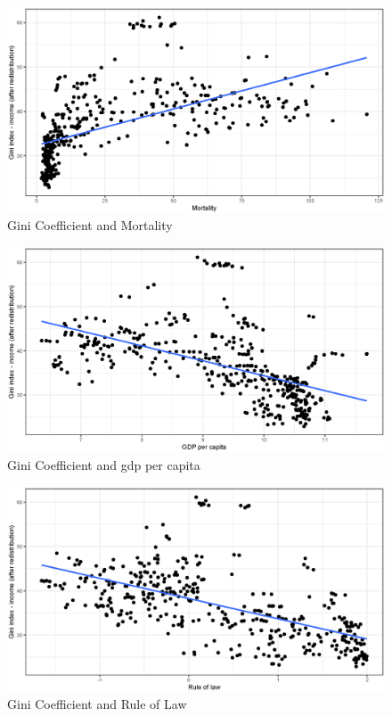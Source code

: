 \documentclass[a4paper,11pt]{article}
\begin{document}
\begin{figure}
    \caption{Gini Coefficient and Mortality}
    \label{fig:ginimort}
\includegraphics[width=\textwidth, keepaspectratio]{figures/MortGiniNet}
\end{figure}

\begin{figure}
    \caption{Gini Coefficient and \ac{gdp} per capita}
    \label{fig:ginigdp}
\includegraphics[width=\textwidth, keepaspectratio]{figures/GDPGiniNet}
\end{figure}

\begin{figure}
    \caption{Gini Coefficient and Rule of Law}
    \label{fig:ginirule}
\includegraphics[width=\textwidth, keepaspectratio]{figures/RuleLawGiniNet}
\end{figure}
\end{document}
